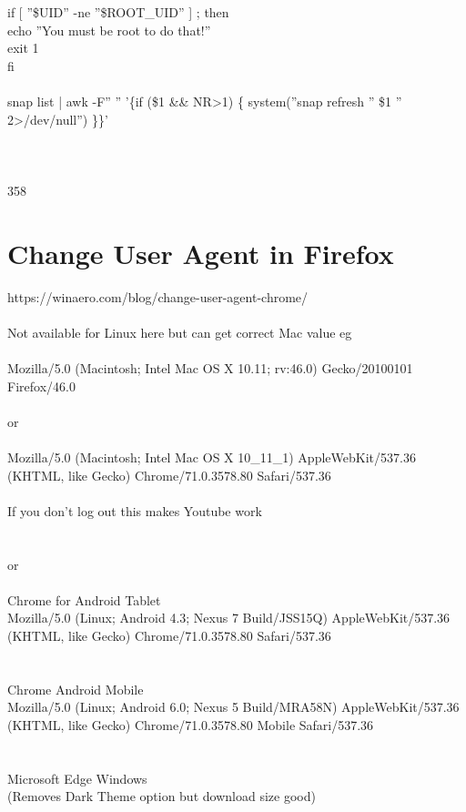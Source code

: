 \documentclass[10pt,a4paper]{article}
\begin{document}
if [ ''\$UID'' -ne ''\$ROOT\_UID'' ] ; then\\
        echo ''You must be root to do that!''\\
        exit 1\\
fi\\
\\
snap list | awk -F'' '' '\{if (\$1 \&\& NR>1) \{ system(''snap refresh '' \$1 '' 2>/dev/null'') \}\}'\\
\\
\\
\\
358
\hypertarget{change_user_agent_in_firefox}{\section {Change User Agent in Firefox}}
https://winaero.com/blog/change-user-agent-chrome/\\
\\
Not available for Linux here but can get correct Mac value eg\\
\\
Mozilla/5.0 (Macintosh; Intel Mac OS X 10.11; rv:46.0) Gecko/20100101 Firefox/46.0\\
\\
or\\
\\
Mozilla/5.0 (Macintosh; Intel Mac OS X 10\_11\_1) AppleWebKit/537.36 (KHTML, like Gecko) Chrome/71.0.3578.80 Safari/537.36\\
\\
If you don't log out this makes Youtube work\\
\\
\\
or\\
\\
Chrome for Android Tablet\\
Mozilla/5.0 (Linux; Android 4.3; Nexus 7 Build/JSS15Q) AppleWebKit/537.36 (KHTML, like Gecko) Chrome/71.0.3578.80 Safari/537.36\\
\\
\\
Chrome Android Mobile\\
Mozilla/5.0 (Linux; Android 6.0; Nexus 5 Build/MRA58N) AppleWebKit/537.36 (KHTML, like Gecko) Chrome/71.0.3578.80 Mobile Safari/537.36\\
\\
\\
Microsoft Edge Windows \\
(Removes Dark Theme option but download size good)\\
\end{document}
